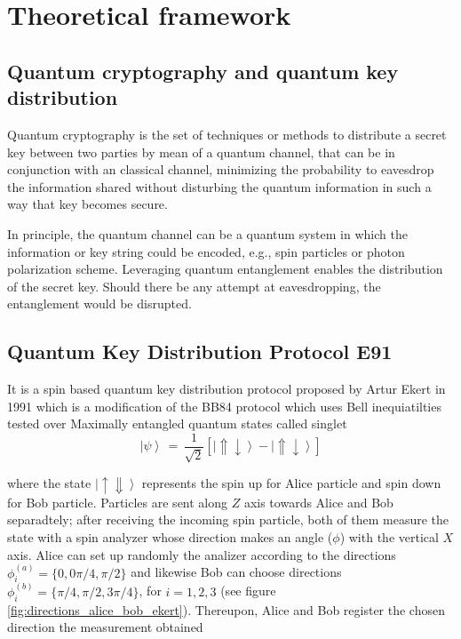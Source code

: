 \section{Theoretical framework}

\subsection{Quantum cryptography and quantum key distribution}



Quantum cryptography is the set of techniques or methods to distribute a secret key  between two parties by mean of a quantum channel, that can be in conjunction with an classical channel, minimizing the probability to eavesdrop the information shared without  disturbing the quantum information in such a way that key becomes secure. \cite{bennett2014quantum}

In principle, the quantum channel can be a quantum system in which the information or key string could be encoded, e.g., spin particles or photon polarization scheme. Leveraging quantum entanglement enables the distribution of the secret key. Should there be any attempt at eavesdropping, the entanglement would be disrupted.

\subsection{Quantum Key Distribution Protocol E91}

It is a spin based quantum key distribution protocol proposed by Artur Ekert in 1991 \cite{ekert1991quantum} which is a modification of the BB84 protocol \cite{ilic2007ekert} which uses Bell inequiatilties tested over Maximally entangled quantum states called singlet
\begin{equation}\label{eqn:singlet_state}
\left\vert\psi\right\rangle\,
=\,
\dfrac{1}{\sqrt{2}} \left[ \left\vert \Uparrow \downarrow \right\rangle - \left\vert \Uparrow \downarrow \right\rangle \right]
\end{equation}

where the state $\left\vert\uparrow\Downarrow\right\rangle$ represents the spin up for Alice particle and spin down for Bob particle. Particles are sent along $Z$ axis towards Alice and Bob separadtely; after receiving the incoming spin particle, both of them measure the state with a spin analyzer whose direction makes an angle ($\phi$) with the vertical $X$ axis. Alice can set up randomly the analizer according to the directions $\phi_{i}^{(a)}=\{0,0\pi/4,\pi/2\}$ and likewise Bob can choose directions $\phi_{i}^{(b)}=\{\pi/4,\pi/2,3\pi/4\}$, for $i=1,2,3$ (see figure \ref{fig:directions_alice_bob_ekert}). Thereupon, Alice and Bob register the chosen direction  the measurement obtained

